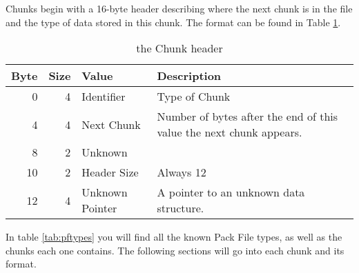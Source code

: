 Chunks begin with a 16-byte header describing where the next chunk is in the
file and the type of data stored in this chunk.  The format can be found in
Table \ref{tab:pfchunkheader}.

\begin{table}[htp]\begin{center}
	\caption{the Chunk header}
	\label{tab:pfchunkheader}
	
	\begin{tabular}{|r|r|l|p{2.5in}|}
		\hline
		\textbf{Byte} & \textbf{Size} & \textbf{Value} & \textbf{Description} \\
		\hline
		 0 & 4 & Identifier      & Type of Chunk \\
		\hline
		 4 & 4 & Next Chunk      & Number of bytes after the end of this value
		                           the next chunk appears. \\
		\hline
		 8 & 2 & Unknown         & \\
		\hline
		10 & 2 & Header Size     & Always 12 \\
		\hline
		12 & 4 & Unknown Pointer & A pointer to an unknown data structure. \\
		\hline
	\end{tabular}
\end{center}\end{table}

In table \ref{tab:pftypes} you will find all the known Pack File types, as well
as the chunks each one contains.  The following sections will go into each chunk
and its format.

